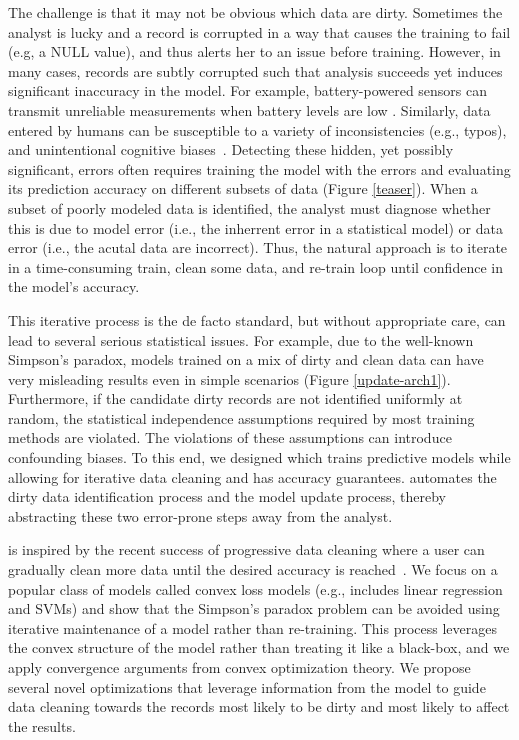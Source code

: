 The challenge is that it may not be obvious which data are dirty.
Sometimes the analyst is lucky and a record is corrupted in a way that causes the training to fail (e.g, a NULL value), and thus alerts her to an issue before training.
However, in many cases, records are subtly corrupted such that analysis succeeds yet induces significant inaccuracy in the model.
For example, battery-powered sensors can transmit unreliable measurements when battery levels are low \cite{DBLP:conf/pervasive/JefferyAFHW06}. 
Similarly, data entered by humans can be susceptible to a variety of inconsistencies (e.g., typos), and unintentional cognitive biases~\cite{DBLP:conf/recsys/KrishnanPFG14}.
Detecting these hidden, yet possibly significant, errors often requires training the model with the errors and evaluating its prediction accuracy on different subsets of data (Figure \ref{teaser}). 
When a subset of poorly modeled data is identified, the analyst must diagnose whether this is due to model error (i.e., the inherrent error in a statistical model) or data error (i.e., the acutal data are incorrect).
Thus, the natural approach is to iterate in a time-consuming train, clean some data, and re-train loop until confidence in the model's accuracy.

This iterative process is the de facto standard, but without appropriate care, can lead to several serious statistical issues.
For example, due to the well-known Simpson's paradox, models trained on a mix of dirty and clean data can have very misleading results even in simple scenarios (Figure \ref{update-arch1}).
Furthermore, if the candidate dirty records are not identified uniformly at random, the statistical independence assumptions required by most training methods are violated. 
The violations of these assumptions can introduce confounding biases.
To this end, we designed \sys which trains predictive models while allowing for iterative data cleaning and has accuracy guarantees.
\sys automates the dirty data identification process and the model update process, thereby abstracting these two error-prone steps away from the analyst.

\sys is inspired by the recent success of progressive data cleaning where a user can gradually clean more data until the desired accuracy is reached~\cite{altowim2014progressive, whang2014incremental, papenbrock2015progressive, gruenheid2014incremental, mayfield2010eracer, DBLP:journals/pvldb/YakoutENOI11, yakout2013don}.
We focus on a popular class of models called convex loss models (e.g., includes linear regression and SVMs) and show that the Simpson's paradox problem can be avoided using iterative maintenance of a model rather than re-training.
This process leverages the convex structure of the model rather than treating it like a black-box, and we apply convergence arguments from convex optimization theory.
We propose several novel optimizations that leverage information from the model to guide data cleaning towards the records most likely to be dirty and most likely to affect the results.

